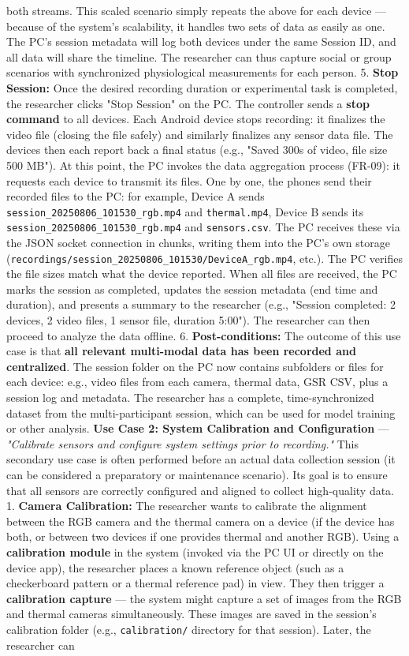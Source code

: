 both streams. This scaled scenario simply repeats the above for each device --- because of the system's scalability, it handles two sets of data as easily as one. The PC's session metadata will log both devices under the same Session ID, and all data will share the timeline. The researcher can thus capture social or group scenarios with synchronized physiological measurements for each person. 5. \textbf{Stop Session:} Once the desired recording duration or experimental task is completed, the researcher clicks "Stop Session" on the PC. The controller sends a \textbf{stop command} to all devices. Each Android device stops recording: it finalizes the video file (closing the file safely) and similarly finalizes any sensor data file. The devices then each report back a final status (e.g., "Saved 300s of video, file size 500 MB"). At this point, the PC invokes the data aggregation process (FR-09): it requests each device to transmit its files. One by one, the phones send their recorded files to the PC: for example, Device A sends \texttt{session\_20250806\_101530\_rgb.mp4} and \texttt{thermal.mp4}, Device B sends its \texttt{session\_20250806\_101530\_rgb.mp4} and \texttt{sensors.csv}. The PC receives these via the JSON socket connection in chunks, writing them into the PC's own storage (\texttt{recordings/session\_20250806\_101530/DeviceA\_rgb.mp4}, etc.). The PC verifies the file sizes match what the device reported. When all files are received, the PC marks the session as completed, updates the session metadata (end time and duration), and presents a summary to the researcher (e.g., "Session completed: 2 devices, 2 video files, 1 sensor file, duration 5:00"). The researcher can then proceed to analyze the data offline. 6. \textbf{Post-conditions:} The outcome of this use case is that \textbf{all relevant multi-modal data has been recorded and centralized}. The session folder on the PC now contains subfolders or files for each device: e.g., video files from each camera, thermal data, GSR CSV, plus a session log and metadata. The researcher has a complete, time-synchronized dataset from the multi-participant session, which can be used for model training or other analysis. \textbf{Use Case 2: System Calibration and Configuration} --- \textit{"Calibrate sensors and configure system settings prior to recording."} This secondary use case is often performed before an actual data collection session (it can be considered a preparatory or maintenance scenario). Its goal is to ensure that all sensors are correctly configured and aligned to collect high-quality data. 1. \textbf{Camera Calibration:} The researcher wants to calibrate the alignment between the RGB camera and the thermal camera on a device (if the device has both, or between two devices if one provides thermal and another RGB). Using a \textbf{calibration module} in the system (invoked via the PC UI or directly on the device app), the researcher places a known reference object (such as a checkerboard pattern or a thermal reference pad) in view. They then trigger a \textbf{calibration capture} --- the system might capture a set of images from the RGB and thermal cameras simultaneously. These images are saved in the session's calibration folder (e.g., \texttt{calibration/} directory for that session). Later, the researcher can 